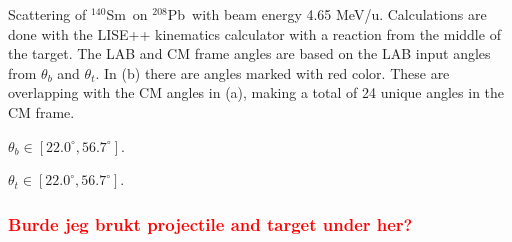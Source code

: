 \documentclass[twoside,english]{uiofysmaster/uiofysmaster}
\newcommand{\Sm}{$^{140}$Sm} %
\newcommand{\Pb}{$^{208}$Pb}
\begin{document}
%		
%		

\begin{table}[htb] 
    \centering 
    \caption{Scattering of \Sm\ on \Pb\ with beam energy 4.65 MeV/u.
    Calculations are done with the LISE++ \cite{LISE} kinematics calculator with a reaction from the middle of the target.
    The LAB and CM frame angles are based on the LAB input angles from $\theta_b$ and $\theta_t$. 
    In (b) there are angles marked with red color. 
    These are overlapping with the CM angles in (a), making a total of 24 unique angles in the CM frame.}
	\label{tab:scattering}
    \begin{subtable}{0.45\textwidth}
    		\centering
		\caption{$\theta_b \in [22.0^\circ, 56.7^\circ]$.}
	 	\label{tab:LABvsCM_b}
	 	
	\end{subtable}
	\begin{subtable}{0.45\textwidth}
		\centering
		\caption{$\theta_t \in [22.0^\circ, 56.7^\circ]$.}
		\label{tab:LABvsCM_t}
		
	\end{subtable}
\end{table}

\subsubsection*{\textcolor{red}{Burde jeg brukt projectile and target under her?}}
\end{document}
